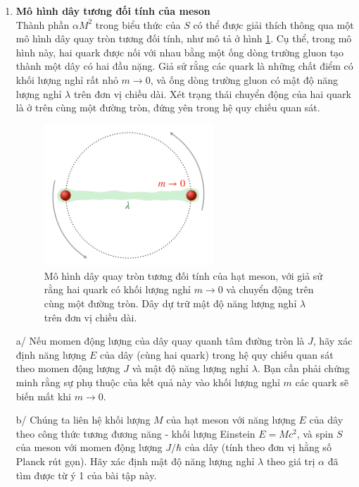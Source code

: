 \begin{enumerate}
    \item \textbf{Mô hình dây tương đối tính của meson}\\
    Thành phần $\alpha M^2$ trong biểu thức của $S$ có thể được giải thích thông qua một mô hình dây quay tròn tương đối tính, như mô tả ở hình \ref{fig02}. Cụ thể, trong mô hình này, hai quark được nối với nhau bằng một ống dòng trường gluon tạo thành một dây có hai đầu nặng. Giả sử rằng các quark là những chất điểm có khối lượng nghỉ rất nhỏ $m \rightarrow 0$, và ống dòng trường gluon có mật độ năng lượng nghỉ $\lambda$ trên đơn vị chiều dài. Xét trạng thái chuyển động của hai quark là ở trên cùng một đường tròn, đứng yên trong hệ quy chiếu quan sát.

    \begin{figure}[!htbp]
\centering
\includegraphics[width=0.6\textwidth]{Problem_20/fig02.png}%
\caption{Mô hình dây quay tròn tương đối tính của hạt meson, với giả sử rằng hai quark có khối lượng nghỉ $m\rightarrow 0$ và chuyển động trên cùng một đường tròn. Dây dự trữ mật độ năng lượng nghỉ $\lambda$ trên đơn vị chiều dài.}
\label{fig02}
\end{figure}

    a/ Nếu momen động lượng của dây quay quanh tâm đường tròn là $J$, hãy xác định năng lượng $E$ của dây (cùng hai quark) trong hệ quy chiếu quan sát theo momen động lượng $J$ và mật độ năng lượng nghỉ $\lambda$. Bạn cần phải chứng minh rằng sự phụ thuộc của kết quả này vào khối lượng nghỉ $m$ các quark sẽ biến mất khi $m \rightarrow 0$.

    b/ Chúng ta liên hệ khối lượng $M$ của hạt meson với năng lượng $E$ của dây theo công thức tương đương năng - khối lượng Einstein $E=Mc^2$, và spin $S$ của meson với momen động lượng $J/\hbar$ của dây (tính theo đơn vị hằng số Planck rút gọn). Hãy xác định mật độ năng lượng nghỉ $\lambda$ theo giá trị $\alpha$ đã tìm được từ ý 1 của bài tập này.


\end{enumerate}
